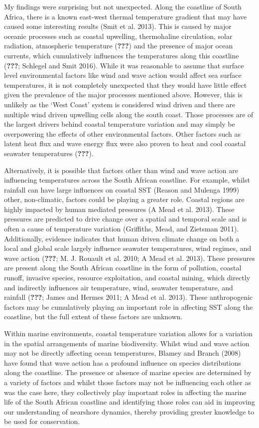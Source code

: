 \documentclass[12pt,A4paper,]{article}
\begin{document}
My findings were surprising but not unexpected. Along the coastline of
South Africa, there is a known east-west thermal temperature gradient
that may have caused some interesting results (Smit et al. 2013). This
is caused by major oceanic processes such as coastal upwelling,
thermohaline circulation, solar radiation, atmospheric temperature
({\textbf{???}}) and the presence of major ocean currents, which
cumulatively influences the temperatures along this coastline
({\textbf{???}}; Schlegel and Smit 2016). While it was reasonable to
assume that surface level environmental factors like wind and wave
action would affect sea surface temperatures, it is not completely
unexpected that they would have little effect given the prevalence of
the major processes mentioned above. However, this is unlikely as the
`West Coast' system is considered wind driven and there are multiple
wind driven upwelling cells along the south coast. Those processes are
of the largest drivers behind coastal temperature variation and may
simply be overpowering the effects of other environmental factors. Other
factors such as latent heat flux and wave energy flux were also proven
to heat and cool coastal seawater temperatures ({\textbf{???}}).

Alternatively, it is possible that factors other than wind and wave
action are influencing temperatures across the South African coastline.
For example, whilst rainfall can have large influences on coastal SST
(Reason and Mulenga 1999) other, non-climatic, factors could be playing
a greater role. Coastal regions are highly impacted by human mediated
pressures (A Mead et al. 2013). These pressures are predicted to drive
change over a spatial and temporal scale and is often a cause of
temperature variation (Griffiths, Mead, and Zietsman 2011).
Additionally, evidence indicates that human driven climate change on
both a local and global scale largely influence seawater temperatures,
wind regimes, and wave action ({\textbf{???}}; M. J. Rouault et al.
2010; A Mead et al. 2013). These pressures are present along the South
African coastline in the form of pollution, coastal runoff, invasive
species, resource exploitation, and coastal mining, which directly and
indirectly influences air temperature, wind, seawater temperature, and
rainfall ({\textbf{???}}; James and Hermes 2011; A Mead et al. 2013).
These anthropogenic factors may be cumulatively playing an important
role in affecting SST along the coastline, but the full extent of these
factors are unknown.

Within marine environments, coastal temperature variation allows for a
variation in the spatial arrangements of marine biodiversity. Whilst
wind and wave action may not be directly affecting ocean temperatures,
Blamey and Branch (2008) have found that wave action has a profound
influence on species distributions along the coastline. The presence or
absence of marine species are determined by a variety of factors and
whilst those factors may not be influencing each other as was the case
here, they collectively play important roles in affecting the marine
life of the South African coastline and identifying those roles can aid
in improving our understanding of nearshore dynamics, thereby providing
greater knowledge to be used for conservation.
\end{document}
